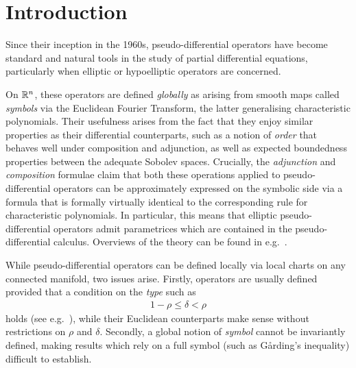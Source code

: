 \chapter{Introduction}

Since their inception in the 1960s,
pseudo-differential operators have become standard and natural tools in the study of partial differential equations,
particularly when elliptic or hypoelliptic operators are concerned.

On $\mathbb{R}^n$,
these operators are defined \emph{globally} as arising from smooth maps called \emph{symbols} via the Euclidean Fourier Transform,
the latter generalising characteristic polynomials.
Their usefulness arises from the fact that they enjoy similar properties as their differential counterparts,
such as a notion of \emph{order} that behaves well under composition and adjunction,
as well as expected boundedness properties between the adequate Sobolev spaces.
Crucially,
the \emph{adjunction} and \emph{composition} formulae claim that
both these operations applied to pseudo-differential operators can be approximately expressed on the symbolic side via a formula that is formally virtually identical to the corresponding rule for characteristic polynomials.
In particular,
this means that elliptic pseudo-differential operators admit parametrices which are contained in the pseudo-differential calculus.
Overviews of the theory can be found in e.g.~\cite{Shubin01,Hormander07}.

While pseudo-differential operators can be defined locally via local charts on any connected manifold,
two issues arise.
Firstly,
operators are usually defined provided that a condition on the \emph{type} such as
\begin{align*}
    1 - \rho \leq \delta < \rho
\end{align*}
holds (see e.g.~\cite[Section 4]{Shubin01}),
while their Euclidean counterparts make sense without restrictions on $\rho$ and $\delta$.
Secondly,
a global notion of \emph{symbol} cannot be invariantly defined,
making results which rely on a full symbol (such as Gårding's inequality) difficult to establish.

